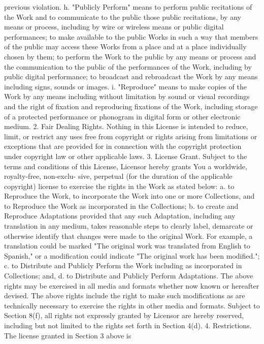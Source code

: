 \documentclass[oneside]{book}
\begin{document}
previous violation.  h. "Publicly Perform" means to perform public recitations
of the Work and to communicate to the public those public recitations, by any
means or process, including by wire or wireless means or public digital
performances; to make available to the public Works in such a way that members
of the public may access these Works from a place and at a place individually
chosen by them; to perform the Work to the public by any means or process and
the communication to the public of the performances of the Work, including by
public digital performance; to broadcast and rebroadcast the Work by any means
including signs, sounds or images.  i. "Reproduce" means to make copies of the
Work by any means including without limitation by sound or visual recordings and
the right of fixation and reproducing fixations of the Work, including storage
of a protected performance or phonogram in digital form or other electronic
medium.  2. Fair Dealing Rights.  Nothing in this License is intended to reduce,
limit, or restrict any uses free from copyright or rights arising from
limitations or exceptions that are provided for in connection with the copyright
protection under copyright law or other applicable laws.  3. License Grant.
Subject to the terms and conditions of this License, Licensor hereby grants You
a worldwide, royalty-free, non-exclu- sive, perpetual (for the duration of the
applicable copyright) license to exercise the rights in the Work as stated
below: a. to Reproduce the Work, to incorporate the Work into one or more
Collections, and to Reproduce the Work as incorporated in the Collections; b. to
create and Reproduce Adaptations provided that any such Adaptation, including
any translation in any medium, takes reasonable steps to clearly label,
demarcate or otherwise identify that changes were made to the original Work. For
example, a translation could be marked "The original work was translated from
English to Spanish," or a modification could indicate "The original work has
been modified."; c. to Distribute and Publicly Perform the Work including as
incorporated in Collections; and, d. to Distribute and Publicly Perform
Adaptations.  The above rights may be exercised in all media and formats whether
now known or hereafter devised. The above rights include the right to make such
modifications as are technically necessary to exercise the rights in other media
and formats. Subject to Section 8(f), all rights not expressly granted by
Licensor are hereby reserved, including but not limited to the rights set forth
in Section 4(d).  4. Restrictions.  The license granted in Section 3 above is
\end{document}
